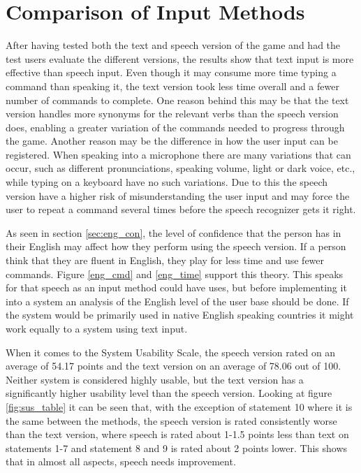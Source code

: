 \section{Comparison of Input Methods} %
After having tested both the text and speech version of the game and had the test users evaluate the different versions, the results show that text input is more effective than speech input. Even though it may consume more time typing a command than speaking it, the text version took less time overall and a fewer number of commands to complete. One reason behind this may be that the text version handles more synonyms for the relevant verbs than the speech version does, enabling a greater variation of the commands needed to progress through the game. Another reason may be the difference in how the user input can be registered. When speaking into a microphone there are many variations that can occur, such as different pronunciations, speaking volume, light or dark voice, etc., while typing on a keyboard have no such variations. Due to this the speech version have a higher risk of misunderstanding the user input and may force the user to repeat a command several times before the speech recognizer gets it right. 

As seen in section \ref{sec:eng_con}, the level of confidence that the person has in their English may affect how they perform using the speech version. If a person think that they are fluent in English, they play for less time and use fewer commands. Figure \ref{eng_cmd} and \ref{eng_time} support this theory. This speaks for that speech as an input method could have uses, but before implementing it into a system an analysis of the English level of the user base should be done. If the system would be primarily used in native English speaking countries it might work equally to a system using text input.

When it comes to the System Usability Scale, the speech version rated on an average of 54.17 points and the text version on an average of 78.06 out of 100. Neither system is considered highly usable, but the text version has a significantly higher usability level than the speech version. Looking at figure \ref{fig:sus_table} it can be seen that, with the exception of statement 10 where it is the same between the methods, the speech version is rated consistently worse than the text version, where speech is rated about 1-1.5 points less than text on statements 1-7 and statement 8 and 9 is rated about 2 points lower. This shows that in almost all aspects, speech needs improvement.

